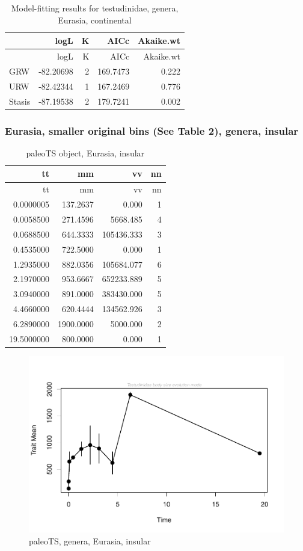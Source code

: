 \documentclass[]{article}
\begin{document}
\begin{longtable}[]{@{}lrrrr@{}}
\caption{Model-fitting results for testudinidae, genera, Eurasia,
continental}\tabularnewline
\toprule
& logL & K & AICc & Akaike.wt\tabularnewline
\midrule
\endfirsthead
\toprule
& logL & K & AICc & Akaike.wt\tabularnewline
\midrule
\endhead
GRW & -82.20698 & 2 & 169.7473 & 0.222\tabularnewline
URW & -82.42344 & 1 & 167.2469 & 0.776\tabularnewline
Stasis & -87.19538 & 2 & 179.7241 & 0.002\tabularnewline
\bottomrule
\end{longtable}

\newpage 

\subsubsection{Eurasia, smaller original bins (See Table 2), genera,
insular}\label{eurasia-smaller-original-bins-see-table-2-genera-insular}

\begin{longtable}[]{@{}rrrr@{}}
\caption{paleoTS object, Eurasia, insular}\tabularnewline
\toprule
tt & mm & vv & nn\tabularnewline
\midrule
\endfirsthead
\toprule
tt & mm & vv & nn\tabularnewline
\midrule
\endhead
0.0000005 & 137.2637 & 0.000 & 1\tabularnewline
0.0058500 & 271.4596 & 5668.485 & 4\tabularnewline
0.0688500 & 644.3333 & 105436.333 & 3\tabularnewline
0.4535000 & 722.5000 & 0.000 & 1\tabularnewline
1.2935000 & 882.0356 & 105684.077 & 6\tabularnewline
2.1970000 & 953.6667 & 652233.889 & 5\tabularnewline
3.0940000 & 891.0000 & 383430.000 & 5\tabularnewline
4.4660000 & 620.4444 & 134562.926 & 3\tabularnewline
6.2890000 & 1900.0000 & 5000.000 & 2\tabularnewline
19.5000000 & 800.0000 & 0.000 & 1\tabularnewline
\bottomrule
\end{longtable}

\begin{figure}[htbp]
\centering
\includegraphics{MA_JJ_files/figure-latex/pTSEsI-1.pdf}
\caption{paleoTS, genera, Eurasia, insular}
\end{figure}
\end{document}
